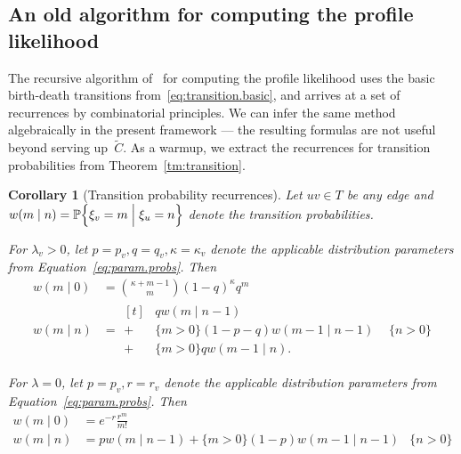 \documentclass{elsarticle}
\newcommand{\condgen}[6]{{#1}#2 #5 #3 #6 #4}
\newcommand{\PROB}{\mathbb{P}}
\newcommand{\Probcmd}[2]{\condgen{\PROB}{\Bigl\{}{\Bigm|}{\Bigr\}}{#1}{#2}}
\newtheorem{corollary}[theorem]{Corollary}
\newcommand{\nx}{u}
\newcommand{\ny}{v}
\begin{document}
\subsection{An old algorithm for computing the profile likelihood}
The recursive algorithm  
of~\cite{phylobd.archaea,Count} 
for computing the 
profile likelihood uses the basic birth-death 
transitions from~\eqref{eq:transition.basic},
and arrives at a set of recurrences 
by combinatorial principles.  
We can infer the same method algebraically 
in the present framework --- the resulting formulas 
are not useful beyond serving up~$\tilde{C}$. 
As a warmup, we extract the recurrences for transition probabilities
from Theorem~\ref{tm:transition}. 
\begin{corollary}[Transition probability recurrences]\label{cor:transition.rec}
Let $\nx\ny\in T$ be any edge and 
$w(m\mid n) = \Probcmd{\xi_{\ny}=m}{\xi_{\nx}=n}$ 
denote the transition probabilities.

For $\lambda_{\ny}>0$, let $p=p_{\ny},q=q_{\ny}, \kappa=\kappa_{\ny}$ 
denote the applicable distribution parameters 
from Equation~\eqref{eq:param.probs}. 
Then 
\begin{align*}
w(m\mid 0) & = \binom{\kappa+m-1}{m} (1-q)^\kappa q^m\\
w(m\mid n) & = \begin{aligned}[t]
& q w(m\mid n-1) 
\\
+ & \{m>0\} (1-p-q) w(m-1\mid n-1) 
\\
+ &  \{m>0\}  q w(m-1\mid n).
\end{aligned} & \{ n>0\}
\end{align*}


For $\lambda=0$, let $p=p_{\ny}, r=r_{\ny}$ denote the applicable distribution parameters 
from Equation~\eqref{eq:param.probs}. 
Then 
\begin{align*}
w(m\mid 0) & = e^{-r}\frac{r^m}{m!}\\
w(m\mid n) & =  p w(m\mid n-1) 
+ \{m>0\} (1-p) w(m-1\mid n-1) & \{ n>0\}
\end{align*}
\end{corollary}
\end{document}

